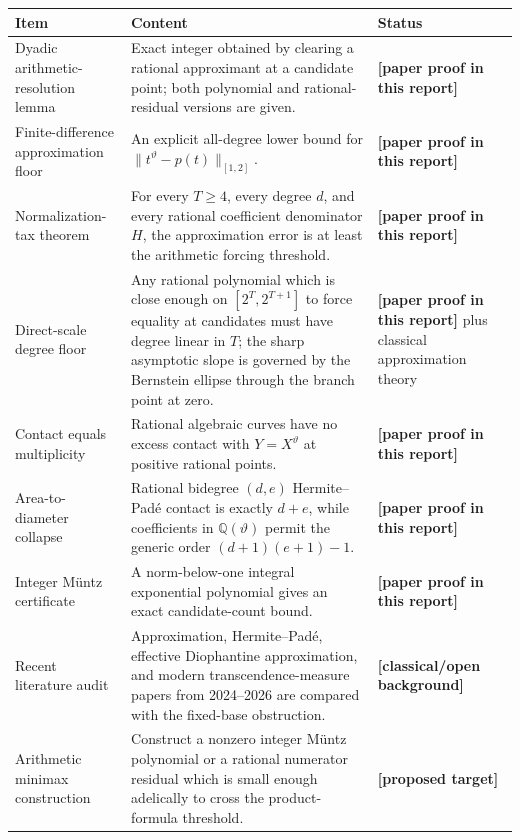 \documentclass[11pt,oneside]{article}
\theoremstyle{definition}
\theoremstyle{remark}
\newcommand{\Q}{\mathbb Q}
\newcommand{\thetaq}{\vartheta}
\newcommand{\statusnew}{\textcolor{newgreen}{\textbf{[paper proof in this report]}}}
\newcommand{\statusknown}{\textcolor{classicalgray}{\textbf{[classical/open background]}}}
\newcommand{\statusopen}{\textcolor{classicalgray}{\textbf{[proposed target]}}}
\begin{document}
\begin{center}
\begin{tabularx}{0.97\textwidth}{@{}>{\raggedright\arraybackslash}p{}X>{\raggedright\arraybackslash}p{}@{}}
\toprule
Item & Content & Status\\
\midrule
Dyadic arithmetic-resolution lemma & Exact integer obtained by clearing a rational approximant at a candidate point; both polynomial and rational-residual versions are given. & \statusnew\\
\addlinespace
Finite-difference approximation floor & An explicit all-degree lower bound for \(\|t^{\thetaq}-p(t)\|_{[1,2]}\). & \statusnew\\
\addlinespace
Normalization-tax theorem & For every \(T\ge4\), every degree \(d\), and every rational coefficient denominator \(H\), the approximation error is at least the arithmetic forcing threshold. & \statusnew\\
\addlinespace
Direct-scale degree floor & Any rational polynomial which is close enough on \([2^T,2^{T+1}]\) to force equality at candidates must have degree linear in \(T\); the sharp asymptotic slope is governed by the Bernstein ellipse through the branch point at zero. & \statusnew{} plus classical approximation theory\\
\addlinespace
Contact equals multiplicity & Rational algebraic curves have no excess contact with \(Y=X^{\thetaq}\) at positive rational points. & \statusnew\\
\addlinespace
Area-to-diameter collapse & Rational bidegree \((d,e)\) Hermite--Pad\'e contact is exactly \(d+e\), while coefficients in \(\Q(\thetaq)\) permit the generic order \((d+1)(e+1)-1\). & \statusnew\\
\addlinespace
Integer M\"untz certificate & A norm-below-one integral exponential polynomial gives an exact candidate-count bound. & \statusnew\\
\addlinespace
Recent literature audit & Approximation, Hermite--Pad\'e, effective Diophantine approximation, and modern transcendence-measure papers from 2024--2026 are compared with the fixed-base obstruction. & \statusknown\\
\addlinespace
Arithmetic minimax construction & Construct a nonzero integer M\"untz polynomial or a rational numerator residual which is small enough adelically to cross the product-formula threshold. & \statusopen\\
\bottomrule
\end{tabularx}
\end{center}
\end{document}
